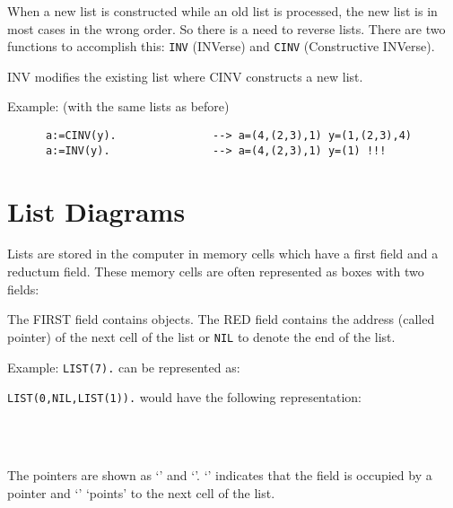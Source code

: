 When a new list is constructed while an old list
is processed, the new list is in most cases
in the wrong order. So there is a need to
reverse lists. There are two functions to 
accomplish this: \verb/INV/ (INVerse) and 
\verb/CINV/ (Constructive INVerse).

INV modifies the existing list where CINV 
constructs a new list.

Example: (with the same lists as before) 
\begin{verbatim}
      a:=CINV(y).               --> a=(4,(2,3),1) y=(1,(2,3),4) 
      a:=INV(y).                --> a=(4,(2,3),1) y=(1) !!!
\end{verbatim}


\section{List Diagrams}

Lists are stored in the computer in memory cells which
have a first field and a reductum field. These memory
cells are often represented as boxes with two fields:

\begin{center}
\end{center}

The FIRST field contains objects. The RED field
contains the address (called pointer) of the 
next cell of the list or \verb/NIL/ to 
denote the end of the list.

Example: \verb/LIST(7)./ can be represented as:
\begin{center}
\end{center}

\verb/LIST(0,NIL,LIST(1))./ would have the following
representation:
\begin{center}
                \pcell{\arr}{}
              \pcell{\arr}{}
              \\
\pcell{}{}                           \pcell{}{}
\pcell{}{}                           \pcell{}{}
\pcell{$\downarrow$}{}               \\
\pcell{}{}                           \pcell{}{}
\pcell{}{}                           \pcell{}{}
\end{center}

The pointers are shown as `\ptr' and `\arr'.
`\ptr' indicates that the field is occupied by a pointer
and `\arr' `points' to the next cell of the list.

